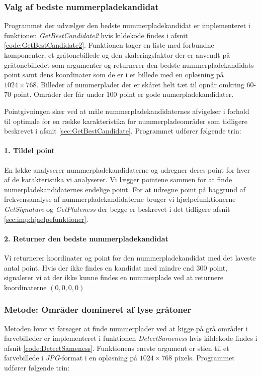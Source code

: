 \subsubsection{Valg af bedste nummerpladekandidat}
\label{sec:imp:GetBestCandidate}
Programmet der udvælger den bedste nummerpladekandidat er implementeret i funktionen \textit{GetBestCandidate2} hvis kildekode findes i afsnit \vref{code:GetBestCandidate2}. Funktionen tager en liste med forbundne komponenter, et gråtonebillede og den skaleringsfaktor der er anvendt på gråtonebilledet som argumenter og returnerer den bedste nummerpladekandidats point samt dens koordinater som de er i et billede med en opløsning på $1024 \times 768$. Billeder af nummerplader der er skåret helt tæt til opnår omkring 60-70 point. Områder der får under 100 point er gode numerpladekandidater. 

Pointgivningen sker ved at måle nummerpladekandidaternes afvigelser i forhold til optimale for en række karakteristika for nummerpladeområder som tidligere beskrevet i afsnit \vref{sec:GetBestCandidate}.
Programmet udfører følgende trin:

\paragraph{1. Tildel point}
En løkke analyserer nummerpladekandidaterne og udregner deres point for hver af de karakteristika vi analyserer. Vi lægger pointene sammen for at finde numerpladekandidaternes endelige point. For at udregne point på baggrund af frekvensanalyse af nummerpladekandidaterne bruger vi hjælpefunktionerne \textit{GetSignature} og \textit{GetPlateness} der begge er beskrevet i det tidligere afsnit \vref{sec:imp:hjaelpefunktioner}. 

\paragraph{2. Returner den bedste nummerpladekandidat}
Vi returnerer koordinater og point for den nummerpladekandidat med det laveste antal point. Hvis der ikke findes en kandidat med mindre end 300 point, signalerer vi at der ikke kunne findes en nummerplade ved at returnere koordinaterne $(0,0,0,0)$ 


\subsubsection{Metode: Områder domineret af lyse gråtoner}
Metoden hvor vi førsøger at finde nummerplader ved at kigge på grå områder i farvebilleder er implementeret i funktionen \textit{DetectSameness} hvis kildekode findes i afsnit \vref{code:DetectSameness}. Funktionens eneste argument er stien til et farvebillede i \textit{JPG}-format i en opløsning på $1024 \times 768$ pixels. Programmet udfører følgende trin:

